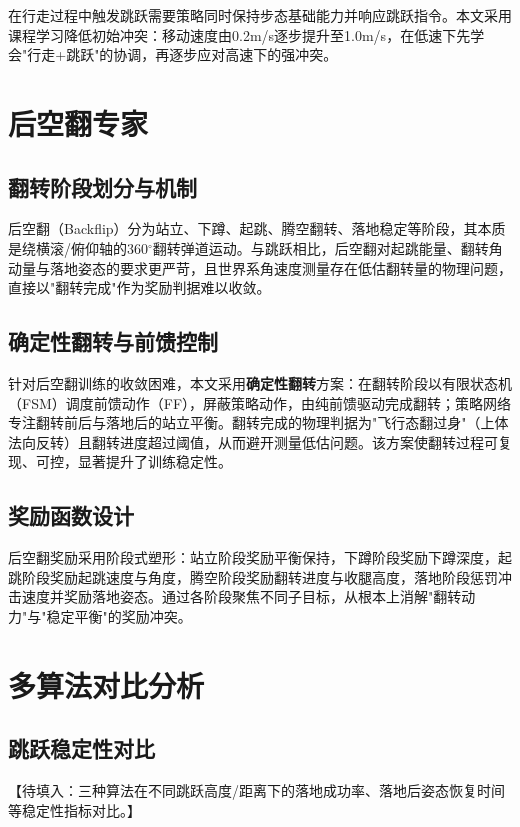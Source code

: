 在行走过程中触发跳跃需要策略同时保持步态基础能力并响应跳跃指令。本文采用课程学习降低初始冲突：移动速度由0.2m/s逐步提升至1.0m/s，在低速下先学会"行走+跳跃"的协调，再逐步应对高速下的强冲突。

\section{后空翻专家}

\subsection{翻转阶段划分与机制}

后空翻（Backflip）分为站立、下蹲、起跳、腾空翻转、落地稳定等阶段，其本质是绕横滚/俯仰轴的360$^\circ$翻转弹道运动。与跳跃相比，后空翻对起跳能量、翻转角动量与落地姿态的要求更严苛，且世界系角速度测量存在低估翻转量的物理问题，直接以"翻转完成"作为奖励判据难以收敛。

\subsection{确定性翻转与前馈控制}

针对后空翻训练的收敛困难，本文采用\textbf{确定性翻转}方案：在翻转阶段以有限状态机（FSM）调度前馈动作（FF），屏蔽策略动作，由纯前馈驱动完成翻转；策略网络专注翻转前后与落地后的站立平衡。翻转完成的物理判据为"飞行态翻过身"（上体法向反转）且翻转进度超过阈值，从而避开测量低估问题。该方案使翻转过程可复现、可控，显著提升了训练稳定性。

\subsection{奖励函数设计}

后空翻奖励采用阶段式塑形：站立阶段奖励平衡保持，下蹲阶段奖励下蹲深度，起跳阶段奖励起跳速度与角度，腾空阶段奖励翻转进度与收腿高度，落地阶段惩罚冲击速度并奖励落地姿态。通过各阶段聚焦不同子目标，从根本上消解"翻转动力"与"稳定平衡"的奖励冲突。

\section{多算法对比分析}

\subsection{跳跃稳定性对比}

【待填入：三种算法在不同跳跃高度/距离下的落地成功率、落地后姿态恢复时间等稳定性指标对比。】

